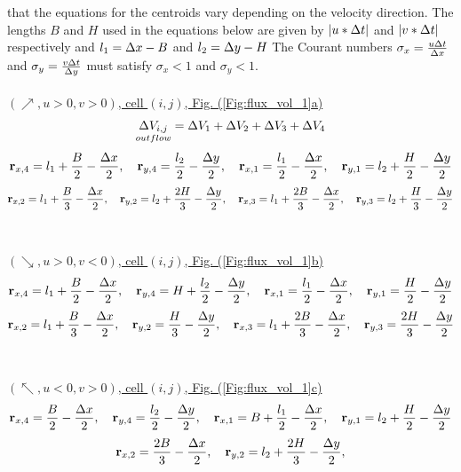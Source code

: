 \documentclass[fleqn]{article}
\begin{document}
{that the equations for the centroids vary depending on the velocity direction.
The lengths $B$ and $H$ used in the equations below are given by $|u * \delt|$
and $|v * \delt|$ respectively and $l_{1} = \delx - B$ and $l_{2} = \dely - H$
The Courant numbers $\sigma_{x}=\frac{ u \delt}{\delx}$ and $\sigma_{y} =
\frac{ v \delt}{\dely}$ must satisfy $\sigma_x< 1$ and $\sigma_y < 1$.
\\
\\
\underline{$(\nearrow, u > 0, v > 0)$, cell $(i, j)$, Fig. (\ref{Fig:flux_vol_1}a)}
\\
\[  \underset{outflow}{\Delta V_{i,j}}      = \delV_1 + \delV_2 + \delV_3 + \delV_4  \]
%
%
\[  \rr_{x,4} = l_1 + \frac{B}{2} -\XCC,   \quad   \rr_{y,4} = \frac{l_2}{2} - \YCC,   
    \quad
    \rr_{x,1} = \frac{l_1}{2} - \XCC,      \quad   \rr_{y,1} = l_2  + \frac{H}{2} - \YCC \]
%
%
\[  \rr_{x,2} = l_1 + \frac{B}{3} - \XCC,   \quad   \rr_{y,2} = l_2 + \frac{2H}{3} - \YCC,
    \quad                              
    \rr_{x,3} = l_1 + \frac{2B}{3} - \XCC,  \quad   \rr_{y,3} = l_2 + \frac{H}{3} - \YCC\]
%
%
\\
\\
\underline{$(\searrow, u > 0, v < 0)$, cell $(i, j)$, Fig. (\ref{Fig:flux_vol_1}b)}
\\
%
%
\[  \rr_{x,4} = l_1 + \frac{B}{2} - \XCC,   \quad   \rr_{y,4} = H + \frac{l_2}{2} - \YCC,   
    \quad
    \rr_{x,1} = \frac{l_1}{2} - \XCC,       \quad   \rr_{y,1} = \frac{H}{2} - \YCC \]
%
%
\[  \rr_{x,2} = l_1 + \frac{B}{3} - \XCC,   \quad   \rr_{y,2} = \frac{H}{3} - \YCC,
    \quad                              
    \rr_{x,3} = l_1 + \frac{2B}{3} - \XCC,  \quad   \rr_{y,3} = \frac{2H}{3} - \YCC\]
%
%
\\
\\
\underline{$(\nwarrow, u < 0, v > 0)$, cell $(i, j)$, Fig. (\ref{Fig:flux_vol_1}c)}
\\
%
%
\[  \rr_{x,4} = \frac{B}{2} - \XCC,            \quad   \rr_{y,4} = \frac{l_2}{2} - \YCC,   
    \quad
    \rr_{x,1} = B + \frac{l_1}{2} - \XCC,      \quad   \rr_{y,1} = l_2  + \frac{H}{2} - \YCC \]
%
%
\[  \rr_{x,2} = \frac{2B}{3} - \XCC,           \quad   \rr_{y,2} = l_2 + \frac{2H}{3} - \YCC,
\]}
\end{document}
